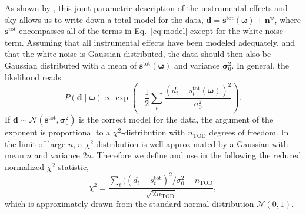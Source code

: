\documentclass[twocolumn]{../../common/aa}
\begin{document}
As shown by \citet{bp01}, this joint parametric description of the instrumental effects and sky allows us to write down a total model for the data, $\boldsymbol d=\boldsymbol s^\mathrm{tot}(\boldsymbol\omega)+\boldsymbol n^\mathrm w$, where $\boldsymbol s^\mathrm{tot}$ encompasses all of the terms in Eq.~\eqref{eq:model} except for the white noise term. Assuming that all instrumental effects have been modeled adequately, and that the white noise is Gaussian distributed, the data should then also be Gaussian distributed with a mean of $\boldsymbol s^\mathrm{tot}(\boldsymbol\omega)$ and variance $\boldsymbol \sigma_0^2$. In general, the likelihood reads
\begin{equation}
	P(\boldsymbol d\mid\boldsymbol\omega)\propto\exp\left(-\frac12\sum_t\frac{(d_t-s^\mathrm{tot}_t(\boldsymbol\omega))^2}{\sigma_0^2}
	\right).
\end{equation}
If $\boldsymbol d\sim\mathcal N(\boldsymbol s^\mathrm{tot},\boldsymbol\sigma_0^2)$ is the correct model for the data, the argument of the exponent is proportional to a $\chi^2$-distribution with $n_\mathrm{TOD}$ degrees of freedom. In the limit of large $n$, a $\chi^2$ distribution is well-approximated by a Gaussian with mean $n$ and variance $2n$. Therefore we define and use in the following the reduced normalized $\chi^2$ statistic,
\begin{equation}
	\chi^2\equiv \frac{\sum_t((d_t-s_t^\mathrm{tot})^2/\sigma_0^2 - n_\mathrm{TOD}}{\sqrt{2n_\mathrm{TOD}}},
\end{equation}
which is approximately drawn from the standard normal distribution $\mathcal N(0,1)$.
\end{document}
